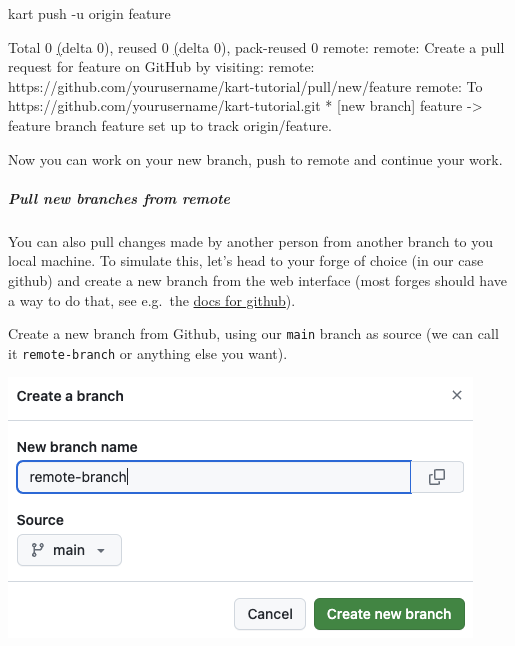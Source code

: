 \documentclass[
  letterpaper,
  DIV=11,
  numbers=noendperiod]{scrartcl}
\let\oldsubparagraph\subparagraph
\renewcommand{\subparagraph}[1]{\oldsubparagraph{#1}\mbox{}}
\newenvironment{Shaded}{\begin{snugshade}}{\end{snugshade}}
\newcommand{\AttributeTok}[1]{\textcolor[rgb]{1.00,0.47,0.78}{#1}}
\newcommand{\ErrorTok}[1]{\textcolor[rgb]{1.00,0.33,0.33}{\underline{#1}}}
\newcommand{\ExtensionTok}[1]{\textcolor[rgb]{0.55,0.91,0.99}{#1}}
\newcommand{\KeywordTok}[1]{\textcolor[rgb]{1.00,0.47,0.78}{#1}}
\newcommand{\NormalTok}[1]{\textcolor[rgb]{0.97,0.97,0.95}{#1}}
\newcommand{\OperatorTok}[1]{\textcolor[rgb]{0.97,0.97,0.95}{#1}}
\newcommand{\StringTok}[1]{\textcolor[rgb]{0.95,0.98,0.55}{#1}}
\begin{document}
\begin{Shaded}
\begin{Highlighting}[]
\ExtensionTok{kart}\NormalTok{ push }\AttributeTok{{-}u}\NormalTok{ origin feature}

\ExtensionTok{Total}\NormalTok{ 0 }\ErrorTok{(}\ExtensionTok{delta}\NormalTok{ 0}\KeywordTok{)}\ExtensionTok{,}\NormalTok{ reused 0 }\ErrorTok{(}\ExtensionTok{delta}\NormalTok{ 0}\KeywordTok{)}\ExtensionTok{,}\NormalTok{ pack{-}reused 0}
\ExtensionTok{remote:}
\ExtensionTok{remote:}\NormalTok{ Create a pull request for }\StringTok{\textquotesingle{}feature\textquotesingle{}}\NormalTok{ on GitHub by visiting:}
\ExtensionTok{remote:}\NormalTok{      https://github.com/yourusername/kart{-}tutorial/pull/new/feature}
\ExtensionTok{remote:}
\ExtensionTok{To}\NormalTok{ https://github.com/yourusername/kart{-}tutorial.git}
 \ExtensionTok{*}\NormalTok{ [new branch]      feature }\AttributeTok{{-}}\OperatorTok{\textgreater{}}\NormalTok{ feature}
\ExtensionTok{branch} \StringTok{\textquotesingle{}feature\textquotesingle{}}\NormalTok{ set up to track }\StringTok{\textquotesingle{}origin/feature\textquotesingle{}}\NormalTok{.}
\end{Highlighting}
\end{Shaded}

Now you can work on your new branch, push to remote and continue your
work.

\subparagraph{Pull new branches from
remote}\label{pull-new-branches-from-remote}

You can also pull changes made by another person from another branch to
you local machine. To simulate this, let's head to your forge of choice
(in our case github) and create a new branch from the web interface
(most forges should have a way to do that, see e.g.~the
\href{https://docs.github.com/en/pull-requests/collaborating-with-pull-requests/proposing-changes-to-your-work-with-pull-requests/creating-and-deleting-branches-within-your-repository}{docs
for github}).

Create a new branch from Github, using our \texttt{main} branch as
source (we can call it \texttt{remote-branch} or anything else you
want).

\begin{center}
\includegraphics{img/github-create-new-branch.png}
\end{center}
\end{document}
